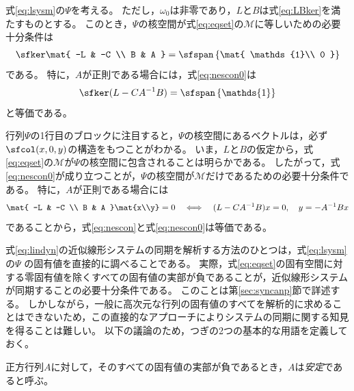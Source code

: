 \documentclass[tombow,dvipdfmx]{corona-a5}
\begin{document}
\begin{補題}[近似線形システムが同期するための必要条件]\label{lem:nescon}
式\ref{eq:lsysm}の$\Psi$を考える。
ただし，$\omega_0$は非零であり，$L$と$B$は式\ref{eq:LBker}を満たすものとする。
このとき，$\Psi$の核空間が式\ref{eq:eqset}の$\mathcal{M}$に等しいための必要十分条件は
\begin{align}\label{eq:nescon0}
\sfker \mat{
-L & -C \\
B & A
}
= \sfspan
\left\{
\mat{
\mathds{1}\\
0
}
\right\}
\end{align}
である。
特に，$A$が正則である場合には，式\ref{eq:nescon0}は
\begin{align}\label{eq:nescon}
\sfker (L-CA^{-1}B) = \sfspan
\left\{
\mathds{1}
\right\}
\end{align}
と等価である。
\end{補題}

\begin{証明}
行列$\Psi$の1行目のブロックに注目すると，$\Psi$の核空間にあるベクトルは，必ず$\sfcol(x,0,y)$の構造をもつことがわかる。
いま，$L$と$B$の仮定から，式\ref{eq:eqset}の$\mathcal{M}$が$\Psi$の核空間に包含されることは明らかである。
したがって，式\ref{eq:nescon0}が成り立つことが，$\Psi$の核空間が$\mathcal{M}$だけであるための必要十分条件である。
特に，$A$が正則である場合には
\begin{align*}
\mat{
-L & -C \\
B & A
}\mat{x\\y}
=0
\quad
\Longleftrightarrow
\quad
(L-CA^{-1}B)x=0,
\quad
y=-A^{-1}Bx
\end{align*}
であることから，式\ref{eq:nescon}と式\ref{eq:nescon0}は等価である。
\end{証明}




式\ref{eq:lindyn}の近似線形システムの同期を解析する方法のひとつは，式\ref{eq:lsysm}の$\Psi$
の固有値を直接的に調べることである。
実際，式\ref{eq:eqset}の固有空間に対する零固有値を除くすべての固有値の実部が負であることが，近似線形システムが同期することの必要十分条件である。
このことは第\ref{sec:syncanp}節で詳述する。
しかしながら，一般に高次元な行列の固有値のすべてを解析的に求めることはできないため，この直接的なアプローチによりシステムの同期に関する知見を得ることは難しい。
以下の議論のため，つぎの2つの基本的な用語を定義しておく。

\begin{定義}[正方行列の安定性]
\label{def:matsta}
正方行列$A$に対して，そのすべての固有値の実部が負であるとき，$A$は\emph{安定}であると呼ぶ。
\end{定義}
\end{document}

